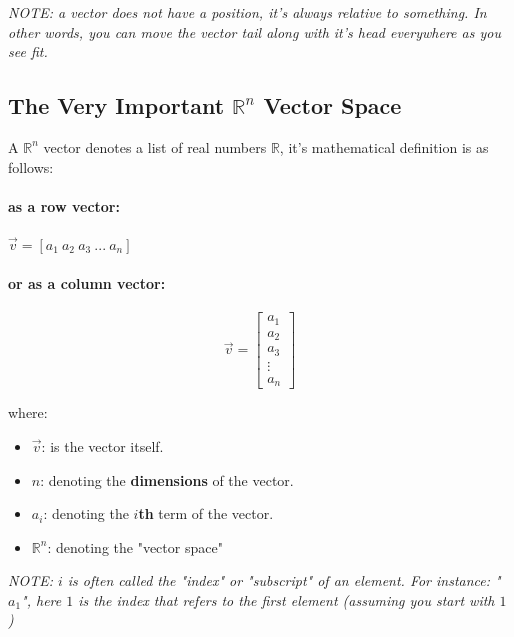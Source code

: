 \vspace{.5em}

\emph{
    NOTE: a vector does not have a position, it's always relative to something.
    In other words, you can move the vector tail along with it's head everywhere as you see fit.
}


\subsection{The Very Important $\mathbb{R}^n$ Vector Space}
A $\mathbb{R}^n$ vector denotes a list of real numbers $\mathbb{R}$, it's mathematical definition is as follows:

\paragraph{as a row vector:}
\begin{center}
    $\vec{v}=[a_1~a_2~a_3~...~a_n]$
\end{center}

\paragraph{or as a column vector:}
\begin{center}
    \[
        {\vec{v}} = \begin{bmatrix}a_1 \\ a_2 \\ a_3 \\ \vdots \\ a_n\end{bmatrix}
    \]
\end{center}

where:
\begin{itemize}
    \item $\vec{v}$: is the vector itself.
    \item $n$: denoting the \textbf{dimensions} of the vector.
    \item $a_i$: denoting the \textbf{$i$th} term of the vector.
    \item $\mathbb{R}^n$: denoting the "vector space"
\end{itemize}

\vspace{.5em}

\emph{
    NOTE: $i$ is often called the "index" or "subscript" of an element. For instance:
    "$a_1$", here $1$ is the index that refers to the first element (assuming you start with $1$)
}

